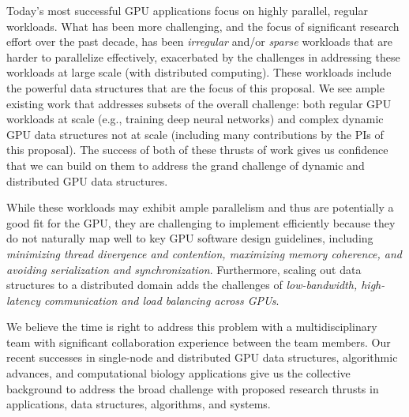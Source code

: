 
 Today's most successful GPU applications focus on
highly parallel, regular workloads. What has been more challenging, and the
focus of significant research effort over the past decade, has been
\emph{irregular} and/or \emph{sparse} workloads that are harder to parallelize
effectively, exacerbated by the challenges in addressing these workloads at
large scale (with distributed computing). These workloads include the powerful
data structures that are the focus of this proposal. We see ample existing work
that addresses subsets of the overall challenge: both regular GPU workloads at
scale (e.g., training deep neural networks) and complex dynamic GPU data
structures not at scale (including many contributions by the PIs of this
proposal). The success of both of these thrusts of work gives us confidence
that we can build on them to address the grand challenge of dynamic and
distributed GPU data structures.

While these workloads may exhibit ample parallelism and thus are potentially a
good fit for the GPU, they are challenging to implement efficiently because
they do not naturally map well to key GPU software design guidelines, including
\emph{minimizing thread divergence and contention, maximizing memory coherence,
and avoiding serialization and synchronization}. Furthermore, scaling out data
structures to a distributed domain adds the challenges of \emph{low-bandwidth,
high-latency communication and load balancing across GPUs}.

We believe the time is right to address this problem with a multidisciplinary
team with significant collaboration experience between the team members. Our
recent successes in single-node and distributed GPU data structures,
algorithmic advances, and computational biology applications give us the
collective background to address the broad challenge with proposed research
thrusts in applications, data structures, algorithms, and systems.

